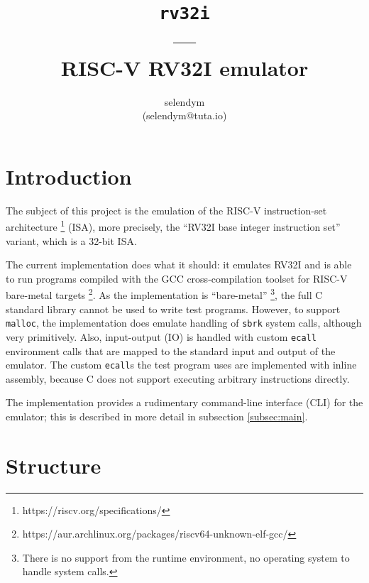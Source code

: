 \documentclass[a4paper]{amsart}
\begin{document}
\title[]{\lowercase{\texttt{rv32i}}\\---\\RISC-V RV32I emulator}
\author[]{\lowercase{selendym\\(selendym@tuta.io)}}
\date{\DTMnow}

\maketitle



\bigbreak
\section{Introduction}

\noindent
The subject of this project is the emulation of the RISC-V instruction-set architecture%
\footnote{https://riscv.org/specifications/}
(ISA), more precisely, the ``RV32I base integer instruction set'' variant, which is a 32-bit ISA.

The current implementation does what it should: it emulates RV32I and is able to run programs compiled with the GCC cross-compilation toolset for RISC-V bare-metal targets%
\footnote{https://aur.archlinux.org/packages/riscv64-unknown-elf-gcc/}.
As the implementation is ``bare-metal''%
\footnote{There is no support from the runtime environment, no operating system to handle system calls.},
the full C standard library cannot be used to write test programs.
However, to support \texttt{malloc}, the implementation does emulate handling of \texttt{sbrk} system calls, although very primitively.
Also, input-output (IO) is handled with custom \texttt{ecall} environment calls that are mapped to the standard input and output of the emulator.
The custom \texttt{ecall}s the test program uses are implemented with inline assembly, because C does not support executing arbitrary instructions directly.

The implementation provides a rudimentary command-line interface (CLI) for the emulator; this is described in more detail in subsection \ref{subsec:main}.



\bigbreak
\section{Structure}
\end{document}
